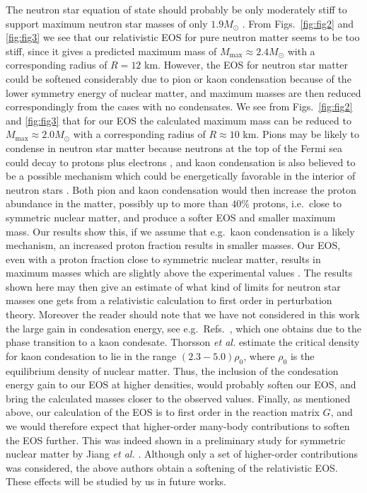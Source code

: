 The neutron star equation of state should probably be only 
moderately stiff to support maximum neutron star masses of
only $1.9 M_{\odot}$ \cite{thorsett93}. From Figs.\ \ref{fig:fig2}
and \ref{fig:fig3} we see that our relativistic EOS for pure neutron
matter seems to be too stiff, since it gives a predicted 
maximum mass of $M_{\mathrm{max}}\approx 2.4 M_{\odot}$ with
a corresponding radius of $R=12$ km. However, the EOS for neutron star
matter could be softened considerably due to pion or kaon
condensation because of the lower symmetry energy of nuclear matter,
and maximum masses are then reduced correspondingly
from the cases with no condensates. We see from Figs.\ \ref{fig:fig2}
and \ref{fig:fig3} that for our EOS the calculated maximum mass
can be reduced to $M_{\mathrm{max}}\approx 2.0 M_{\odot}$
with a corresponding radius of $R\approx 10$ km. Pions may be likely
to condense in neutron star matter because neutrons at the top of
the Fermi sea could decay to protons plus electrons
\cite{migdal78,migdal90,ps75,bp79,prog93,mo88},
and kaon condensation is also believed to be a possible mechanism
which could be energetically favorable in the interior of neutron
stars \cite{brown93,thorson93,brown93b,muto93}. Both pion and kaon
condensation would then increase the proton abundance in the matter,
possibly up to more than $40\%$ protons, i.e.\ close to symmetric
nuclear matter, and produce a softer EOS and smaller maximum mass.
Our results show this, if we assume that e.g.\ kaon condensation is
a likely mechanism, an increased proton fraction results in smaller
masses. Our EOS, even with a proton fraction close to
symmetric nuclear matter, results in maximum masses which are slightly
above the experimental values \cite{thorsett93}.
The results shown here may then give an estimate of what kind of
limits for neutron star masses one gets from a relativistic
calculation to first order in perturbation theory. Moreover
the reader should note that we have not considered in this work
the large gain
in condesation energy, see e.g.\ Refs.\ \cite{thorson93,muto93}, which one
obtains due to the phase transition to a kaon condesate. Thorsson
{\em et al.} \cite{thorson93} estimate the critical density
for kaon condesation to lie in the range $(2.3-5.0)\rho_0$, where
$\rho_0$ is the equilibrium density of nuclear matter.
Thus, the inclusion of the condesation energy gain to our EOS at higher
densities, would probably soften our EOS, and bring the
calculated masses closer to the observed values.
Finally, as mentioned above, our calculation
of the EOS is to first order in the reaction matrix $G$, and we would
therefore expect that higher-order many-body contributions to
soften the EOS further. This was indeed shown in a preliminary study for
symmetric nuclear matter by Jiang {\em et al.} \cite{jiang93}. Although
only a set of higher-order contributions was considered, the above
authors obtain a softening of the relativistic EOS. These
effects will be studied by us in future works.





